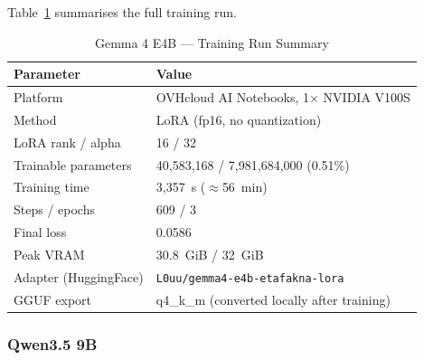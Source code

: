 
Table~\ref{tab:gemma-training} summarises the full training run.

\begin{table}[H]
\centering
\caption{Gemma 4 E4B --- Training Run Summary}
\label{tab:gemma-training}
\renewcommand{\arraystretch}{1.3}
\begin{tabular}{|p{5.5cm}|p{7cm}|}
\hline
\textbf{Parameter} & \textbf{Value} \\
\hline
Platform & OVHcloud AI Notebooks, 1$\times$ NVIDIA V100S \\
\hline
Method & LoRA (fp16, no quantization) \\
\hline
LoRA rank / alpha & 16 / 32 \\
\hline
Trainable parameters & 40,583,168 / 7,981,684,000 (0.51\%) \\
\hline
Training time & 3,357~s ($\approx$56~min) \\
\hline
Steps / epochs & 609 / 3 \\
\hline
Final loss & 0.0586 \\
\hline
Peak VRAM & 30.8~GiB / 32~GiB \\
\hline
Adapter (HuggingFace) & \texttt{L0uu/gemma4-e4b-etafakna-lora} \\
\hline
GGUF export & q4\_k\_m (converted locally after training) \\
\hline
\end{tabular}
\end{table}

\subsubsection{Qwen3.5 9B}
\label{subsubsec:ch4-qwen-training}

